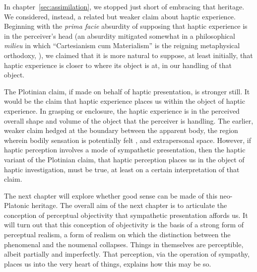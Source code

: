 In chapter~\ref{sec:assimilation}, we stopped just short of embracing that heritage. We considered, instead, a related but weaker claim about haptic experience. Beginning with the \emph{prima facie} absurdity of supposing that haptic experience is in the perceiver's head (an absurdity mitigated somewhat in a philosophical \emph{milieu} in which ``Cartesianism cum Materialism'' is the reigning metaphysical orthodoxy, \citealt{Putnam:1993kx,Putnam:1994kx,Putnam:1999eu}), we claimed that it is more natural to suppose, at least initially, that haptic experience is closer to where its object is at, in our handling of that object. 

The Plotinian claim, if made on behalf of haptic presentation, is stronger still. It would be the claim that haptic experience places us within the object of haptic experience. In grasping or enclosure, the haptic experience is in the perceived overall shape and volume of the object that the perceiver is handling. The earlier, weaker claim hedged at the boundary between the apparent body, the region wherein bodily sensation is potentially felt \citep{Martin:1992aa}, and extrapersonal space. However, if haptic perception involves a mode of sympathetic presentation, then the haptic variant of the Plotinian claim, that haptic perception places us in the object of haptic investigation, must be true, at least on a certain interpretation of that claim. 

The next chapter will explore whether good sense can be made of this neo-Platonic heritage. The overall aim of the next chapter is to articulate the conception of perceptual objectivity that sympathetic presentation affords us. It will turn out that this conception of objectivity is the basis of a strong form of perceptual realism, a form of realism on which the distinction between the phenomenal and the noumenal collapses. Things in themselves are perceptible, albeit partially and imperfectly. That perception, via the operation of sympathy, places us into the very heart of things, explains how this may be so.





